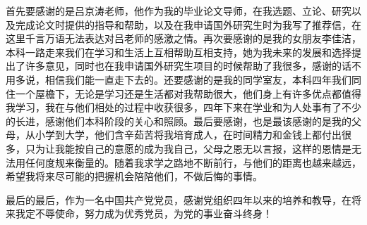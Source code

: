 \documentclass[tsinghuacite]{HustGraduPaper}
\begin{document}
	\newpage

	
	\begin{thankpage}
	
	首先要感谢的是吕京涛老师，他作为我的毕业论文导师，在我选题、立论、研究以及完成论文时提供的指导和帮助，以及在我申请国外研究生时为我写了推荐信，在这里千言万语无法表达对吕老师的感激之情。再次要感谢的是我的女朋友李佳洁，本科一路走来我们在学习和生活上互相帮助互相支持，她为我未来的发展和选择提出了许多意见，同时也在我申请国外研究生项目的时候帮助了我很多，感谢的话不用多说，相信我们能一直走下去的。还要感谢的是我的同学室友，本科四年我们同住一个屋檐下，无论是学习还是生活都对我帮助很大，他们身上有许多优点都值得我学习，我在与他们相处的过程中收获很多，四年下来在学业和为人处事有了不少的长进，感谢他们本科阶段的关心和照顾。最后要感谢，也是最该感谢的是我的父母，从小学到大学，他们含辛茹苦将我培育成人，在时间精力和金钱上都付出很多，只为让我能按自己的意愿的成为我自己，父母之恩无以言报，这样的恩情是无法用任何度规来衡量的。随着我求学之路地不断前行，与他们的距离也越来越远，希望我将来尽可能的把握机会陪陪他们，不做后悔的事情。
	
	最后的最后，作为一名中国共产党党员，感谢党组织四年以来的培养和教导，在将来我定不辱使命，努力成为优秀党员，为党的事业奋斗终身！


	\end{thankpage}
	

	\newpage
	
	
	
	

	
\end{document}
